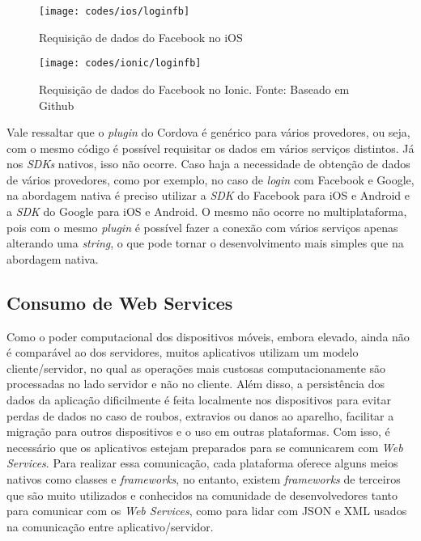 \begin{figure}[H]
	\centering
	\texttt{[image: codes/ios/loginfb]}
	\caption[Requisição de dados do Facebook no iOS]{Requisição de dados do Facebook no iOS}
	\label{fig:loginfb-ios}
\end{figure}

\begin{figure}[H]
	\centering
	\texttt{[image: codes/ionic/loginfb]}
	\caption[Requisição de dados do Facebook no Ionic]{Requisição de dados do Facebook no Ionic. Fonte: Baseado em Github\protect\footnotemark}
	\label{fig:loginfb-ionic}
\end{figure}


Vale ressaltar que o \textit{plugin} do Cordova é genérico para vários provedores, ou seja, com o mesmo código é possível requisitar os dados em vários serviços distintos. Já nos \textit{SDKs} nativos, isso não ocorre.
Caso haja a necessidade de obtenção de dados de vários provedores, como por exemplo, no caso de \textit{login} com Facebook e Google, na abordagem nativa é preciso utilizar a \textit{SDK} do Facebook para iOS e Android
e a \textit{SDK} do Google para iOS e Android. O mesmo não ocorre no multiplataforma, pois com o mesmo \textit{plugin} é possível fazer a conexão com vários serviços apenas alterando uma \textit{string}, 
o que pode tornar o desenvolvimento mais simples que na abordagem nativa.

\subsection{Consumo de Web Services} \label{subsec:webservices}
Como o poder computacional dos dispositivos móveis, embora elevado, ainda não é comparável ao dos servidores, muitos aplicativos utilizam um modelo cliente/servidor, no qual
as operações mais custosas computacionamente são processadas no lado servidor e não no cliente. Além disso, a persistência dos dados da aplicação dificilmente é feita localmente nos dispositivos para evitar 
perdas de dados no caso de roubos, extravios ou danos ao aparelho, facilitar a migração para outros dispositivos e o uso em outras plataformas. Com isso, é necessário que os aplicativos estejam preparados para se 
comunicarem com \textit{Web Services}. Para realizar essa comunicação, cada plataforma oferece alguns meios nativos como classes e \textit{frameworks}, no entanto, existem \textit{frameworks} de terceiros que 
são muito utilizados e conhecidos na comunidade de desenvolvedores tanto para comunicar com os \textit{Web Services}, como para lidar com JSON e XML usados na comunicação entre aplicativo/servidor. 

